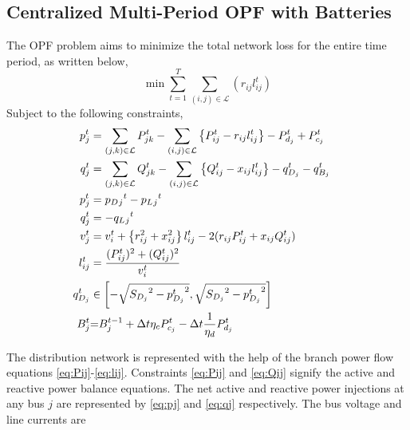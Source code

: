 \documentclass{article}
\begin{document}
\subsection{Centralized Multi-Period OPF with Batteries}
The OPF problem aims to minimize the total network loss for the entire time period, as written below,
\begin{equation}
    \min {\sum_{t = 1}^{T} \sum_{(i, j) \in \mathcal{L}} (r_{ij}l_{ij}^t)}
\end{equation}
Subject to the following constraints,
\begin{align}
    {p_j^t} & = {\sum_{(j, k) \in \mathcal{L}} P_{jk}^t - \sum_{(i, j) \in \mathcal{L}}\left\{P_{ij}^t - r_{ij}l_{ij}^t\right\} - P_{d_j}^t + P_{c_j}^t} && \label{eq:Pij} \\ 
    {q_j^t} & = {\sum_{(j, k) \in \mathcal{L}} Q_{jk}^t - \sum_{(i, j) \in \mathcal{L}}\left\{Q_{ij}^t - x_{ij}l_{ij}^t\right\} - q_{D_j}^t - q_{B_j}^t} && \label{eq:Qij} \\ 
    {p_j^t} &= {p_D{_j}^t - p_L{_j}^t} \label{eq:pj}\\
    {q_j^t} &= {-q_L{_j}^t} \label{eq:qj}\\
    {v_j^t} & = {v_{i}^t +  \left\{r_{ij}^2 + x_{ij}^2\right\}l_{ij}^t - 2(r_{ij}P_{ij}^t + x_{ij}Q_{ij}^t)} \label{eq:vj} && \\
    {l_{ij}^t} & = {\frac{(P_{ij}^{t})^2 + (Q_{ij}^{t})^2}{v_i^t}} \label{eq:lij} && \\
    { q^{t}_{D_{j}} } 
    &\in
    { \left[-\sqrt{ {S_{D_{j}}}^2 - {p^{t}_{D_{j}}}^2}, \sqrt{ {S_{D_{j}}}^2 - {p^{t}_{D_{j}}}^2}\right] } \label{eq:qDj} && \\
    {\color{darkgreen}{ B_{j}^{t} }} &\color{darkgreen}{=} { \color{darkgreen}{ B_{j}^{t-1} + \Delta t  \eta_c P_{c_j}^t - \Delta t\frac{1}{\eta_d} P_{d_j}^t } } && \\
\end{align}

The distribution network is represented with the help of the branch power flow equations \cref{eq:Pij}-\cref{eq:lij}. Constraints \cref{eq:Pij} and \cref{eq:Qij} signify the active and reactive power balance equations. The net active and reactive power injections at any bus \(j\) are represented by \cref{eq:pj} and \cref{eq:qj} respectively. The bus voltage and line currents are 




\end{document}
